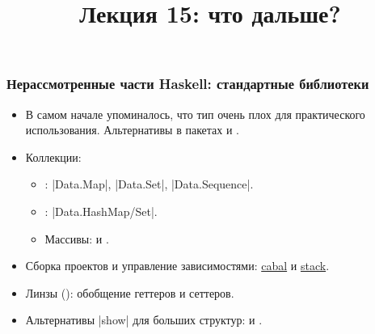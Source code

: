 \documentclass[11pt]{beamer}
\title{Лекция 15: что дальше?}
\begin{document}
\begin{frame}[plain]
  \maketitle
\end{frame}

\begin{frame}[fragile]
  \frametitle{Нерассмотренные части Haskell: стандартные библиотеки}
  \begin{itemize}
    \item В самом начале упоминалось, что тип  очень плох для практического использования. Альтернативы в пакетах  и .
    \item Коллекции:
          \begin{itemize}
            \item {}: \haskinline|Data.Map|, \haskinline|Data.Set|, \haskinline|Data.Sequence|.
            \item {}: \haskinline|Data.Hash{Map/Set}|.
            \item Массивы:  и .
          \end{itemize}
    \item Сборка проектов и управление зависимостями: \href{https://cabal.readthedocs.io/en/stable/}{cabal} и \href{https://docs.haskellstack.org/en/stable/}{stack}.
    \item Линзы (): обобщение геттеров и сеттеров.
    \item Альтернативы \haskinline|show| для больших структур:  и .
  \end{itemize}
\end{frame}
\end{document}
